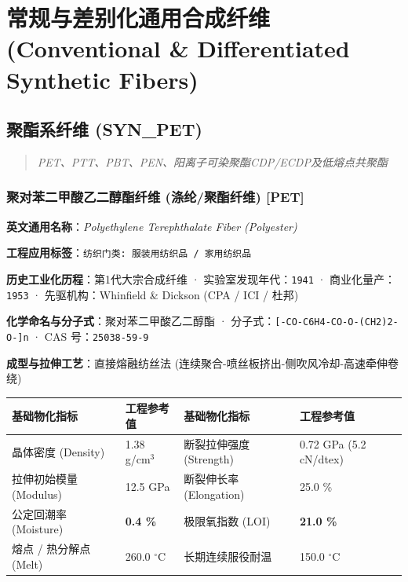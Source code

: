 \documentclass[11pt,openright,twoside,UTF8]{ctexbook}
\begin{document}
\part{常规与差别化通用合成纤维 (Conventional \& Differentiated Synthetic Fibers)}

\chapter{聚酯系纤维 (SYN\_PET)}
\begin{quote}
\small\itshape
PET、PTT、PBT、PEN、阳离子可染聚酯CDP/ECDP及低熔点共聚酯
\end{quote}

\section{聚对苯二甲酸乙二醇酯纤维 (涤纶/聚酯纤维) [PET]}
\label{sec:pet}

\noindent\textbf{英文通用名称}：\textit{Polyethylene Terephthalate Fiber (Polyester)}\par
\noindent\textbf{工程应用标签}：\texttt{纺织门类: 服装用纺织品 / 家用纺织品}\par
\noindent\textbf{历史工业化历程}：第1代大宗合成纤维 · 实验室发现年代：\texttt{1941} · 商业化量产：\texttt{1953} · 先驱机构：Whinfield \& Dickson (CPA / ICI / 杜邦)\par
\noindent\textbf{化学命名与分子式}：聚对苯二甲酸乙二醇酯 · 分子式：\texttt{[-CO-C6H4-CO-O-(CH2)2-O-]n} · CAS 号：\texttt{25038-59-9}\par
\noindent\textbf{成型与拉伸工艺}：直接熔融纺丝法 (连续聚合-喷丝板挤出-侧吹风冷却-高速牵伸卷绕)\par

\vspace{0.15cm}
\begin{center}
\small
\begin{tabularx}{\textwidth}{p{3.8cm}Xp{3.8cm}X}
\toprule
\textbf{基础物化指标} & \textbf{工程参考值} & \textbf{基础物化指标} & \textbf{工程参考值} \\
\midrule
晶体密度 (Density) & 1.38 g/cm$^3$ & 断裂拉伸强度 (Strength) & 0.72 GPa (5.2 cN/dtex) \\
拉伸初始模量 (Modulus) & 12.5 GPa & 断裂伸长率 (Elongation) & 25.0 \% \\
公定回潮率 (Moisture) & \textbf{0.4 \%} & 极限氧指数 (LOI) & \textbf{21.0 \%} \\
熔点 / 热分解点 (Melt) & 260.0 $^\circ\mathrm{C}$ & 长期连续服役耐温 & 150.0 $^\circ\mathrm{C}$ \\
\bottomrule
\end{tabularx}
\end{center}
\vspace{0.15cm}
\end{document}

